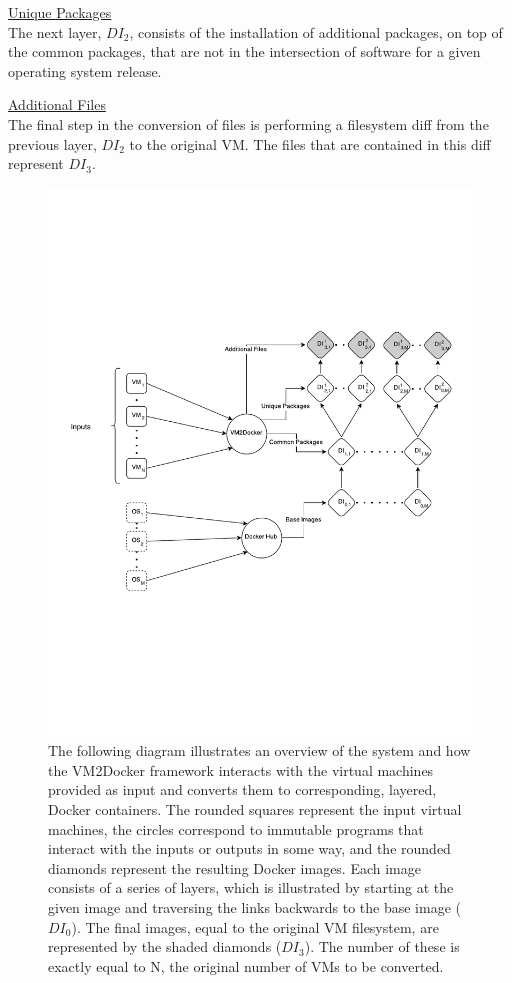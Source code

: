 \underline{Unique Packages}\\
The next layer, $DI_2$, consists of the installation of additional packages, on top of the common packages, that are not in the intersection of software for a given operating system release.

\underline{Additional Files}\\
The final step in the conversion of files is performing a filesystem diff from the previous layer, $DI_2$ to the original VM. The files that are contained in this diff represent $DI_3$.


\newpage
\newpage

\begin{figure}[h]

\centering
    \includegraphics[width=1.0\textwidth]{system.pdf}
    \caption{The following diagram illustrates an overview of the system and how the VM2Docker framework interacts with the virtual machines provided as input and converts them to corresponding, layered, Docker containers. The rounded squares represent the input virtual machines, the circles correspond to immutable programs that interact with the inputs or outputs in some way, and the rounded diamonds represent the resulting Docker images. Each image consists of a series of layers, which is illustrated by starting at the given image and traversing the links backwards to the base image ($DI_0$). The final images, equal to the original VM filesystem, are represented by the shaded diamonds ($DI_3$). The number of these is exactly equal to N, the original number of VMs to be converted.}
\label{fig:systemeval}
\end{figure}

